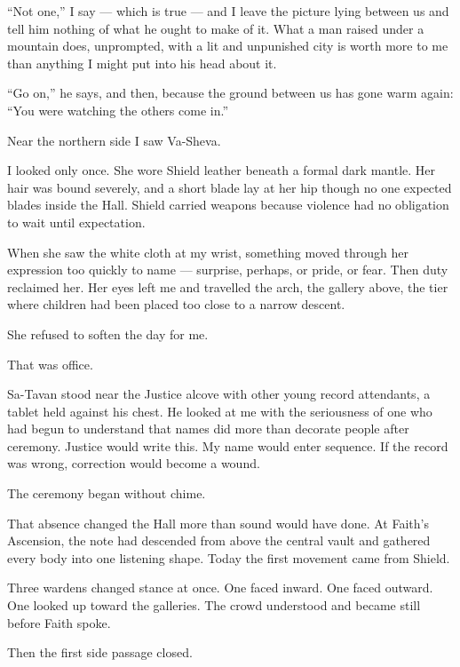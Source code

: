 ``Not one,'' I say --- which is true --- and I leave the picture lying between us and tell him nothing of what he ought to make of it. What a man raised under a mountain does, unprompted, with a lit and unpunished city is worth more to me than anything I might put into his head about it.\par

``Go on,'' he says, and then, because the ground between us has gone warm again: ``You were watching the others come in.''\par

\ornament

Near the northern side I saw Va-Sheva.\par
I looked only once.
She wore Shield leather beneath a formal dark mantle.
Her hair was bound severely, and a short blade lay at her hip though no one expected blades inside the Hall.
Shield carried weapons because violence had no obligation to wait until expectation.\par
When she saw the white cloth at my wrist, something moved through her expression too quickly to name --- surprise, perhaps, or pride, or fear.
Then duty reclaimed her.
Her eyes left me and travelled the arch, the gallery above, the tier where children had been placed too close to a narrow descent.\par
She refused to soften the day for me.\par
That was office.\par
Sa-Tavan stood near the Justice alcove with other young record attendants, a tablet held against his chest.
He looked at me with the seriousness of one who had begun to understand that names did more than decorate people after ceremony.
Justice would write this.
My name would enter sequence.
If the record was wrong, correction would become a wound.\par
The ceremony began without chime.\par
That absence changed the Hall more than sound would have done.
At Faith's Ascension, the note had descended from above the central vault and gathered every body into one listening shape.
Today the first movement came from Shield.\par
Three wardens changed stance at once.
One faced inward.
One faced outward.
One looked up toward the galleries.
The crowd understood and became still before Faith spoke.\par
Then the first side passage closed.\par
